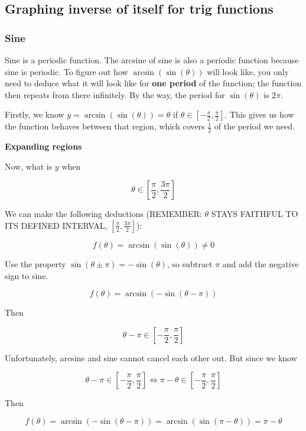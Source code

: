 \documentclass[12pt]{article}
\theoremstyle{plain}
\theoremstyle{remark}
\theoremstyle{definition}
\begin{document}
\subsection{Graphing inverse of itself for trig
functions}


\subsubsection{\texorpdfstring{ Sine}{ Sine}}

Sine is a periodic function. The arcsine of sine is also a periodic
function because sine is periodic. To figure out how
\(\arcsin\left( \sin(\theta) \right)\) will look like, you only need to
deduce what it will look like for \textbf{one period} of the function;
the function then repeats from there infinitely. By the way, the period
for \(\sin(\theta)\) is \(2\pi\).

Firstly, we know \(y = \arcsin\left( \sin(\theta) \right) = \theta\) if
\(\theta \in \left\lbrack - \frac{\pi}{2},\frac{\pi}{2} \right\rbrack\).
This gives us how the function behaves between that region, which covers
\(\frac{1}{2}\) of the period we need.

\textbf{Expanding regions}

Now, what is \(y\) when

\[\theta \in \left\lbrack \frac{\pi}{2},\frac{3\pi}{2} \right\rbrack\]

We can make the following deductions (REMEMBER: \(\theta\) STAYS
FAITHFUL TO ITS DEFINED INTERVAL,
\(\left\lbrack \frac{\pi}{2},\frac{3\pi}{2} \right\rbrack\)):

\[f(\theta) = \arcsin\left( \sin(\theta) \right) \neq 0\]

Use the property \(\sin(\theta \pm \pi) = - \sin(\theta)\), so subtract
\(\pi\) and add the negative sign to sine.

\[f(\theta) = \arcsin\left( - \sin(\theta - \pi) \right)\]

Then

\[\theta - \pi \in \left\lbrack - \frac{\pi}{2},\frac{\pi}{2} \right\rbrack\]

Unfortunately, arcsine and sine cannot cancel each other out. But since
we know

\[\theta - \pi \in \left\lbrack - \frac{\pi}{2},\frac{\pi}{2} \right\rbrack \Leftrightarrow \pi - \theta \in \left\lbrack - \frac{\pi}{2},\frac{\pi}{2} \right\rbrack\]

Then

\[f(\theta) = \arcsin\left( - \sin(\theta - \pi) \right) = \arcsin\left( \sin(\pi - \theta) \right) = \pi - \theta\]
\end{document}
